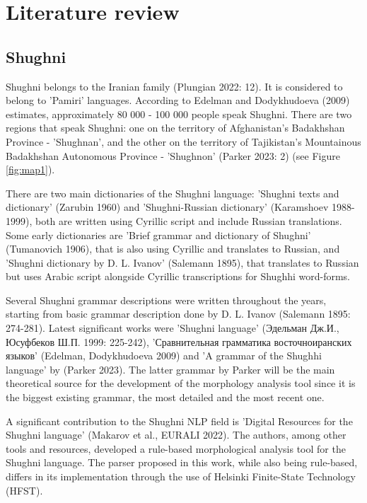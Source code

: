 \section{Literature review}

\subsection{Shughni}
\par Shughni belongs to the Iranian family (Plungian 2022: 12). It is considered to belong to 'Pamiri' languages. According to Edelman and Dodykhudoeva (2009) estimates, approximately 80 000 - 100 000 people speak Shughni. There are two regions that speak Shughni: one on the territory of Afghanistan's Badakhshan Province - 'Shughnan', and the other on the territory of Tajikistan's Mountainous Badakhshan Autonomous Province - 'Shughnon' (Parker 2023: 2) (see Figure \ref{fig:map1}).
\par There are two main dictionaries of the Shughni language: 'Shughni texts and dictionary' (Zarubin 1960) and 'Shughni-Russian dictionary' (Karamshoev 1988-1999), both are written using Cyrillic script and include Russian translations. Some early dictionaries are 'Brief grammar and dictionary of Shughni' (Tumanovich 1906), that is also using Cyrillic and translates to Russian, and 'Shughni dictionary by D. L. Ivanov' (Salemann 1895), that translates to Russian but uses Arabic script alongside Cyrillic transcriptions for Shughhi word-forms.
\par Several Shughni grammar descriptions were written throughout the years, starting from basic grammar description done by D. L. Ivanov (Salemann 1895: 274-281). Latest significant works were 'Shughni language' (Эдельман Дж.И., Юсуфбеков Ш.П. 1999: 225-242), 'Сравнительная грамматика восточноиранских языков' (Edelman, Dodykhudoeva 2009) and 'A grammar of the Shughhi language' by (Parker 2023). The latter grammar by Parker will be the main theoretical source for the development of the morphology analysis tool since it is the biggest existing grammar, the most detailed and the most recent one.
\par A significant contribution to the Shughni NLP field is 'Digital Resources for the Shughni language' (Makarov et al., EURALI 2022). The authors, among other tools and resources, developed a rule-based morphological analysis tool for the Shughni language. The parser proposed in this work, while also being rule-based, differs in its implementation through the use of Helsinki Finite-State Technology (HFST).

